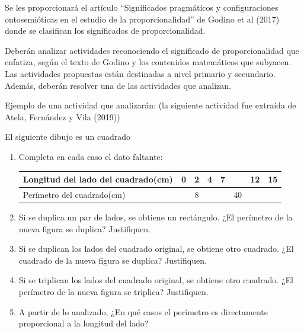 \documentclass[oneside,spanish]{amsart}
\numberwithin{equation}{section}
\numberwithin{figure}{section}
\begin{document}
\begin{description}[itemsep=10pt]
    \item[Actividad 1] Se les proporcionará el artículo “Significados pragmáticos y configuraciones ontosemióticas en el estudio de la proporcionalidad” de Godino et al (2017) donde se clasifican los significados de proporcionalidad.
    \item[Actividad 2] Deberán analizar actividades reconociendo el significado de proporcionalidad que enfatiza, según el texto de Godino y los contenidos matemáticos que subyacen.  Las actividades propuestas están destinadas a nivel primario y secundario. Además, deberán resolver una de las actividades que analizan.

    Ejemplo de una actividad que analizarán: (la siguiente actividad fue extraída de Atela, Fernández y Vila (2019))

    \item[Problema 1] El siguiente dibujo es un cuadrado  

    \begin{enumerate}[label=\alph*), itemsep=10pt]
        \item Completa en cada caso el dato faltante:
            \begin{table}[h]
                \centering
                \begin{tabular}{|l|c|c|c|c|c|c|c|}\hline
                    Longitud del lado del cuadrado(cm) & 0 & 2 & 4 & 7 &  & 12 & 15 \\\hline
                    Perímetro del cuadrado(cm) &  & 8 &  &  & 40 &  &  \\ \hline
                \end{tabular}
                \label{tab:tabla-longitud-perimetro}
            \end{table}
        \item Si se duplica un par de lados, se obtiene un rectángulo. ¿El perímetro de la nueva figura se duplica? Justifiquen.
        \item Si se duplican los lados del cuadrado original, se obtiene otro cuadrado. ¿El cuadrado de la nueva figura se duplica? Justifiquen.
        \item Si se triplican los lados del cuadrado original, se obtiene otro cuadrado. ¿El perímetro de la nueva figura se triplica? Justifiquen.
        \item A partir de lo analizado, ¿En qué casos el perímetro es directamente proporcional a la longitud del lado?

    \end{enumerate}

     
\end{description}
\end{document}
